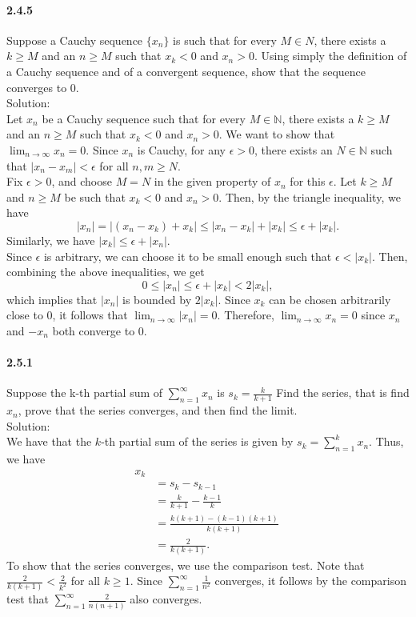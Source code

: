 \documentclass{article}
\begin{document}
\paragraph{2.4.5}
Suppose a Cauchy sequence $\{x_n\}$ is such that for every $M \in N$, there exists a $k \geq M$ and an
$n \geq M$ such that $x_k < 0$ and $x_n > 0$. Using simply the definition of a Cauchy sequence and of a convergent sequence, show that the sequence converges to 0.\\
Solution:\\
Let ${x_n}$ be a Cauchy sequence such that for every $M \in \mathbb{N}$, there exists a $k \geq M$ and an $n \geq M$ such that $x_k < 0$ and $x_n > 0$. We want to show that $\lim_{n \to \infty} x_n = 0$.
Since ${x_n}$ is Cauchy, for any $\epsilon > 0$, there exists an $N \in \mathbb{N}$ such that $|x_n - x_m| < \epsilon$ for all $n, m \geq N$.\\
Fix $\epsilon > 0$, and choose $M = N$ in the given property of ${x_n}$ for this $\epsilon$. Let $k \geq M$ and $n \geq M$ be such that $x_k < 0$ and $x_n > 0$. Then, by the triangle inequality, we have
$$|x_n| = |(x_n - x_k) + x_k| \leq |x_n - x_k| + |x_k| \leq \epsilon + |x_k|.$$
Similarly, we have $|x_k| \leq \epsilon + |x_n|$.\\
Since $\epsilon$ is arbitrary, we can choose it to be small enough such that $\epsilon < |x_k|$. Then, combining the above inequalities, we get
$$0 \leq |x_n| \leq \epsilon + |x_k| < 2|x_k|,$$
which implies that $|x_n|$ is bounded by $2|x_k|$. Since $x_k$ can be chosen arbitrarily close to 0, it follows that $\lim_{n \to \infty} |x_n| = 0$. Therefore, $\lim_{n \to \infty} x_n = 0$ since $x_n$ and $-x_n$ both converge to 0.
\paragraph{2.5.1}
Suppose the k-th partial sum of $\sum_{n=1}^{\infty}x_n$ is $s_k=\frac{k}{k+1}$ Find the series, that is find $x_n$, prove that the series converges, and then find the limit.\\
Solution:\\
We have that the $k$-th partial sum of the series is given by $s_k = \sum_{n=1}^k x_n$. Thus, we have
\begin{align*}
x_k \\&= s_k - s_{k-1}\
\\&= \frac{k}{k+1} - \frac{k-1}{k}\
\\&= \frac{k(k+1)-(k-1)(k+1)}{k(k+1)}\
\\&= \frac{2}{k(k+1)}.
\end{align*}
To show that the series converges, we use the comparison test. Note that $\frac{2}{k(k+1)} < \frac{2}{k^2}$ for all $k \geq 1$. Since $\sum_{n=1}^\infty \frac{1}{n^2}$ converges, it follows by the comparison test that $\sum_{n=1}^\infty \frac{2}{n(n+1)}$ also converges.
\end{document}
